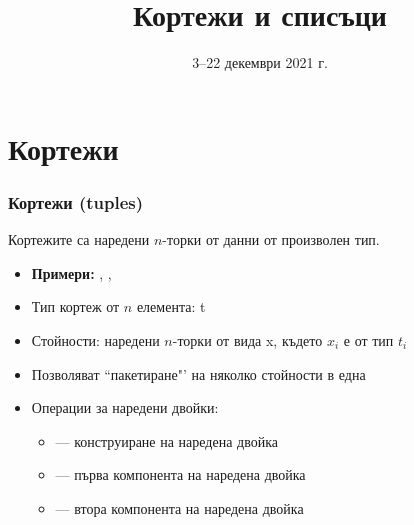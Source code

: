 \documentclass[alsotrans]{beamerswitch}
\title{Кортежи и списъци}
\date{3--22 декември 2021 г.}
\begin{document}
\begin{frame}
  \titlepage
\end{frame}
\section{Кортежи}

\begin{frame}
  \frametitle{Кортежи (tuples)}

  Кортежите са наредени $n$-торки от данни от произволен тип.
  \begin{itemize}[<+->]
  \item \textbf{Примери:} , , 
  \item Тип кортеж от $n$ елемента: \tuple t
  \item Стойности: наредени $n$-торки от вида \tuple x, където $x_i$ е от тип $t_i$
  \item Позволяват ``пакетиране"' на няколко стойности в една
  \item Операции за наредени двойки:
    \begin{itemize}
    \item {} --- конструиране на наредена двойка
    \item {} --- първа компонента на наредена двойка
    \item {} --- втора компонента на наредена двойка
    \end{itemize}
  \end{itemize}
\end{frame}
\end{document}
